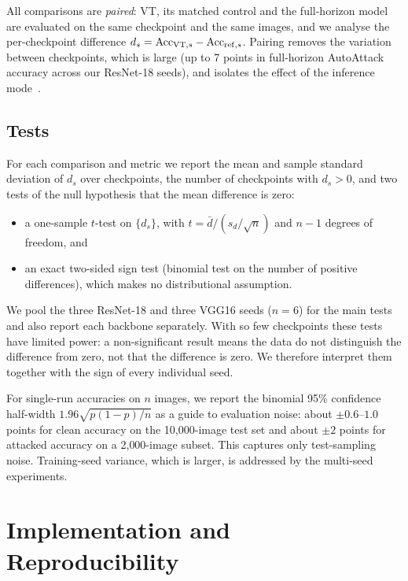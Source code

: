 All comparisons are \emph{paired}: VT, its matched control and the full-horizon model are evaluated on the same checkpoint and the same images, and we analyse the per-checkpoint difference $d_s = \mathrm{Acc}_{\mathrm{VT},s} - \mathrm{Acc}_{\mathrm{ref},s}$. Pairing removes the variation between checkpoints, which is large (up to 7 points in full-horizon AutoAttack accuracy across our ResNet-18 seeds), and isolates the effect of the inference mode~\cite{bouthillier2021accounting}.

\subsection{Tests}

For each comparison and metric we report the mean and sample standard deviation of $d_s$ over checkpoints, the number of checkpoints with $d_s > 0$, and two tests of the null hypothesis that the mean difference is zero:

\begin{itemize}
    \item a one-sample $t$-test on $\{d_s\}$, with $t = \bar{d} / (s_d / \sqrt{n})$ and $n - 1$ degrees of freedom, and
    \item an exact two-sided sign test (binomial test on the number of positive differences), which makes no distributional assumption.
\end{itemize}

We pool the three ResNet-18 and three VGG16 seeds ($n = 6$) for the main tests and also report each backbone separately. With so few checkpoints these tests have limited power: a non-significant result means the data do not distinguish the difference from zero, not that the difference is zero. We therefore interpret them together with the sign of every individual seed.

For single-run accuracies on $n$ images, we report the binomial 95\% confidence half-width $1.96 \sqrt{p(1-p)/n}$ as a guide to evaluation noise: about $\pm 0.6$--$1.0$ points for clean accuracy on the 10{,}000-image test set and about $\pm 2$ points for attacked accuracy on a 2{,}000-image subset. This captures only test-sampling noise. Training-seed variance, which is larger, is addressed by the multi-seed experiments.

\section{Implementation and Reproducibility}
\label{sec:meth-impl}


